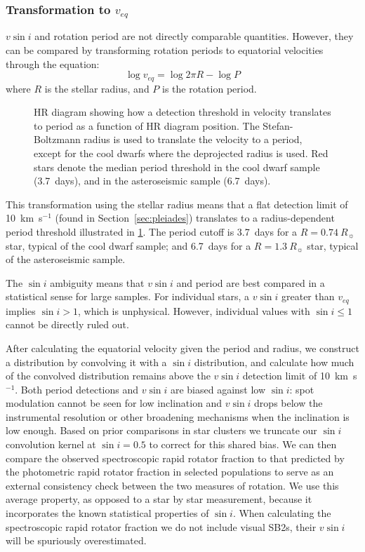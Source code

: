\documentclass[preprint2]{aastex62}
\newcommand{\vsini}{\ensuremath{v \sin i}}
\newcommand{\kms}{\textrm{km~s}\ensuremath{^{-1}}}
\begin{document}
\subsubsection{Transformation to \(v_{eq}\)}
\label{sec:transform}

\vsini{} and rotation period are not directly comparable quantities. However,
they can be compared by transforming rotation periods to equatorial velocities
through the equation:
\begin{equation}
    \log v_{eq} = \log 2 \pi R - \log P
    \label{eq:veq}
\end{equation}
where \(R\) is the stellar radius, and \(P\) is the rotation period.


\begin{figure}[htb]
    \centering
    \caption{HR diagram showing how a detection threshold in velocity
        translates to period as a function of HR diagram position. The
        Stefan-Boltzmann radius is used to translate the velocity to a period, 
        except for the cool dwarfs where the deprojected radius is used.
        Red stars denote the median period threshold in the cool dwarf sample
        (3.7~days), and in the asteroseismic sample 
    (6.7~days).\label{fig:period_vel}}
\end{figure}

This transformation using the stellar radius means that a flat detection limit 
of 10~\kms{} (found in Section~\ref{sec:pleiades}) translates to a 
radius-dependent period threshold illustrated in \cref{fig:period_vel}. 
The period cutoff is 3.7~days for a \(R = 0.74~R_\sun\) star, typical of the 
cool dwarf sample; and 6.7~days for a \(R = 1.3~R_\sun\) star,
typical of the asteroseismic sample. 

The \(\sin i\) ambiguity means that \vsini{} and period are best compared in a
statistical sense for large samples. For individual stars, a \vsini{} greater
than \(v_{eq}\) implies \(\sin i > 1\), which is unphysical. However, individual values
with \(\sin i \le 1\)  cannot be directly ruled out.

After calculating the equatorial velocity given the period
and radius, we construct a distribution by convolving it with a \(\sin i\) 
distribution, and calculate how much of the convolved distribution remains above the
\vsini{} detection limit of 10~\kms. Both period detections and
\vsini{} are biased against low \(\sin i\): spot modulation cannot be seen for
low inclination and \vsini{} drops below the instrumental resolution or other
broadening mechanisms when the inclination is low enough. Based on prior 
comparisons in star clusters we truncate our \(\sin i\) convolution kernel at 
\(\sin i = 0.5\) \citep{Krishnamurthi97,Jackson10} to correct for this shared
bias. We can then compare the observed spectroscopic rapid rotator fraction to that predicted
by the photometric rapid rotator fraction in selected populations to serve as an external 
consistency check between the two measures of rotation. We use this average property, as opposed to a star by
star measurement, because it incorporates the known statistical properties of 
\(\sin i\). When calculating the spectroscopic rapid rotator fraction we do not include
visual SB2s, their \vsini{} will be spuriously overestimated. 
\end{document}

